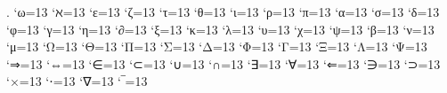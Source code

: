 \renewcommand*{\C}{\mathbb{C}}
\newcommand{\Q}{\mathbb{Q}}
\newcommand{\K}{\mathbb{K}}
\newcommand{\N}{\mathbb{N}}
\newcommand{\Z}{\mathbb{Z}}
\renewcommand{\AA}{\mathbb{A}}
\newcommand{\DD}{\mathbb{D}}
\newcommand{\MM}{\mathbb{M}}
\renewcommand{\a}{~\textnormal{\iflanguage{german}{auf}{on} }}
\renewcommand{\i}{~\textnormal{in }}
\newcommand{\ex}{~\textnormal{\iflanguage{german}{existiert}{exists} }}
\newcommand{\fa}{\quad\textnormal{\iflanguage{german}{für alle}{for all} }}
\newcommand{\st}{\quad\textnormal{s.t. }}
\newcommand{\f}{\quad\textnormal{\iflanguage{german}{für}{for} }}
\newcommand{\so}{\quad\textnormal{\iflanguage{german}{sonst}{else} }}
\newcommand{\fü}{\quad\textnormal{\iflanguage{german}{f.ü.}{a.e.} }}
\newcommand{\m}{~\textnormal{\iflanguage{german}{mit}{with} }}
\newcommand{\E}{\mathbbm{1}}
\renewcommand{\O}{\mathcal{O}}
\renewcommand{\Re}{\operatorname{Re}}
\renewcommand{\Im}{\operatorname{Im}}
\renewcommand{\O}{\mathcal{O}}
\newcommand{\RR}{\mathcal{R}}
\newcommand{\A}{\mathcal{A}}
\newcommand{\M}{\mathcal{M}}
\newcommand{\W}{\mathcal{W}}
\newcommand{\Schwarz}{\mathcal{S}}
\newcommand{\bepsilon}{\varepsilon}
\newcommand{\bphi}{\varphi}
\renewcommand{\epsilon}{\varepsilon}
\renewcommand{\arraystretch}{2.3}
\newcommand{\mydots}[1]{\IfBeginWith{#1}{,}{\ldots#1}{\cdots#1}}
\newcommand{\lt}{\left}
\newcommand{\rt}{\right}
\newcommand{\mt}{\middle}
\arraycolsep=2pt
\makeatletter
{}
 {\let\@ifnextchar\new@ifnextchar
  \left\lbrace
  \def\arraystretch{#2}%
  }
 {\endarray\right.}
\makeatother
\newcommand{\mat}[2][6pt]{\arraycolsep=#1\begin{pmatrix}#2\end{pmatrix}}
\newcommand{\smat}[1]{\left(\begin{smallmatrix}#1\end{smallmatrix}\right)}
\catcode`ω=13
\catcode`ℵ=13
\catcode`ε=13
\catcode`ζ=13
\catcode`τ=13
\catcode`θ=13
\catcode`ι=13
\catcode`ρ=13
\catcode`π=13
\catcode`α=13
\catcode`σ=13
\catcode`δ=13
\catcode`φ=13
\catcode`γ=13
\catcode`η=13
\catcode`∂=13
\catcode`ξ=13
\catcode`κ=13
\catcode`λ=13
\catcode`υ=13
\catcode`χ=13
\catcode`ψ=13
\catcode`β=13
\catcode`ν=13
\catcode`μ=13
\catcode`Ω=13
\catcode`Θ=13
\catcode`Π=13
\catcode`Σ=13
\catcode`Δ=13
\catcode`Φ=13
\catcode`Γ=13
\catcode`Ξ=13
\catcode`Λ=13
\catcode`Ψ=13
\catcode`⇒=13
\catcode`⇔=13
\catcode`∈=13
\catcode`⊂=13
\catcode`∪=13
\catcode`∩=13
\catcode`∃=13
\catcode`∀=13
\catcode`⇐=13
\catcode`∋=13
\catcode`⊃=13
\catcode`×=13
\catcode`⋅=13
\catcode`∇=13
\catcode`‾=13
